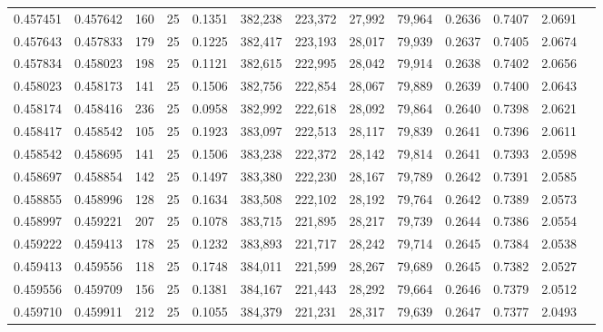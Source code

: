\begin{tabular}{rrrrrrrrrrrrr}
0.457451 & 0.457642 &   160 &  25 &                                     0.1351 & 382,238 & 223,372 &  27,992 &  79,964 & 0.2636 & 0.7407 & 2.0691 \\
0.457643 & 0.457833 &   179 &  25 &                                     0.1225 & 382,417 & 223,193 &  28,017 &  79,939 & 0.2637 & 0.7405 & 2.0674 \\
0.457834 & 0.458023 &   198 &  25 &                                     0.1121 & 382,615 & 222,995 &  28,042 &  79,914 & 0.2638 & 0.7402 & 2.0656 \\
0.458023 & 0.458173 &   141 &  25 &                                     0.1506 & 382,756 & 222,854 &  28,067 &  79,889 & 0.2639 & 0.7400 & 2.0643 \\
0.458174 & 0.458416 &   236 &  25 &                                     0.0958 & 382,992 & 222,618 &  28,092 &  79,864 & 0.2640 & 0.7398 & 2.0621 \\
0.458417 & 0.458542 &   105 &  25 &                                     0.1923 & 383,097 & 222,513 &  28,117 &  79,839 & 0.2641 & 0.7396 & 2.0611 \\
0.458542 & 0.458695 &   141 &  25 &                                     0.1506 & 383,238 & 222,372 &  28,142 &  79,814 & 0.2641 & 0.7393 & 2.0598 \\
0.458697 & 0.458854 &   142 &  25 &                                     0.1497 & 383,380 & 222,230 &  28,167 &  79,789 & 0.2642 & 0.7391 & 2.0585 \\
0.458855 & 0.458996 &   128 &  25 &                                     0.1634 & 383,508 & 222,102 &  28,192 &  79,764 & 0.2642 & 0.7389 & 2.0573 \\
0.458997 & 0.459221 &   207 &  25 &                                     0.1078 & 383,715 & 221,895 &  28,217 &  79,739 & 0.2644 & 0.7386 & 2.0554 \\
0.459222 & 0.459413 &   178 &  25 &                                     0.1232 & 383,893 & 221,717 &  28,242 &  79,714 & 0.2645 & 0.7384 & 2.0538 \\
0.459413 & 0.459556 &   118 &  25 &                                     0.1748 & 384,011 & 221,599 &  28,267 &  79,689 & 0.2645 & 0.7382 & 2.0527 \\
0.459556 & 0.459709 &   156 &  25 &                                     0.1381 & 384,167 & 221,443 &  28,292 &  79,664 & 0.2646 & 0.7379 & 2.0512 \\
0.459710 & 0.459911 &   212 &  25 &                                     0.1055 & 384,379 & 221,231 &  28,317 &  79,639 & 0.2647 & 0.7377 & 2.0493 \\

\end{tabular}
